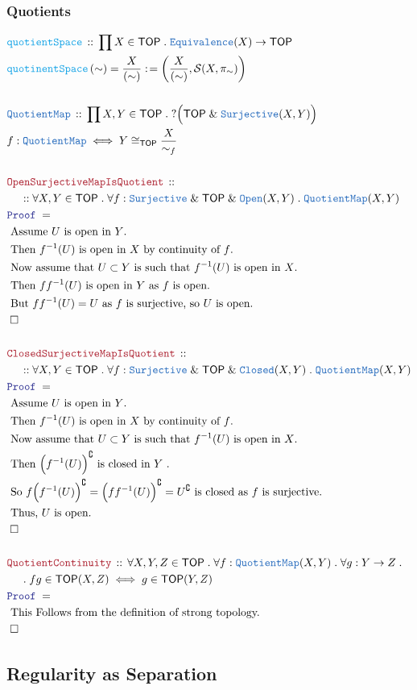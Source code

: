 \documentclass[12pt]{scrartcl}
\newcommand{\TYPE}[1]{\textcolor{NavyBlue}{\mathtt{#1}}}
\newcommand{\FUNC}[1]{\textcolor{Cerulean}{\mathtt{#1}}}
\newcommand{\LOGIC}[1]{\textcolor{Blue}{\mathtt{#1}}}
\newcommand{\THM}[1]{\textcolor{Maroon}{\mathtt{#1}}}
\renewcommand{\.}{\; . \;}
\newcommand{\de}{: \kern 0.1pc =}
\newcommand{\Act}[1]{\left( #1 \right)}
\newcommand{\Theorem}[2]{& \THM{#1} \, :: \, #2 \\ & \Proof = \\ }
\newcommand{\DeclareType}[2]{& \TYPE{#1} \, :: \, #2 \\}
\newcommand{\DefineType}[3]{& #1 : \TYPE{#2} \iff #3 \\}
\newcommand{\DeclareFunc}[2]{& \FUNC{#1} \, :: \, #2 \\}
\newcommand{\DefineNamedFunc}[4]{&  \FUNC{#1}\Act{#2} = #3 \de #4 \\}
\newcommand{\NewLine}{\\ & \kern 1pc}
\newcommand{\Page}[1]{ \begin{align*} #1 \end{align*}   }
\newcommand{\Explain}[1]{& \text{#1.} \\}
\renewcommand{\And}{\; \& \;}
\newcommand{\Surj}{\TYPE{Surjective}}
\renewcommand{\c}{\complement}
\newcommand{\QED}{\; \square}
\newcommand{\EndProof}{& \QED \\}
\newcommand{\Proof}{\LOGIC{Proof} \; }
\newcommand{\Closed}{\TYPE{Closed}}
\newcommand{\Open}{\TYPE{Open}}
\newcommand{\QM}{\TYPE{QuotientMap}}
\newcommand{\TOP}{\mathsf{TOP}}
\renewcommand{\S}{\mathcal{S}}
\begin{document}
\subsubsection{Quotients}
\Page{
	\DeclareFunc{quotientSpace}{\prod X \in \TOP \. \TYPE{Equivalence}(X) \to \TOP}
	\DefineNamedFunc{quotinentSpace}{\sim}{\frac{X}{(\sim)}}{
		\Act{\frac{X}{(\sim)}, \S(X,\pi_\sim)}
	}
	\\
	\DeclareType{QuotientMap}{ 
		\prod X,Y \in \TOP \.    ?\Big(\TOP \And \Surj(X,Y)\Big)
	}
	\DefineType{f}{QuotientMap}{Y \cong_\TOP \frac{X}{\sim_f}}
	\\
	\Theorem{OpenSurjectiveMapIsQuotient}
	{
		\NewLine :: 
		\forall X,Y \in \TOP \.
		\forall f : \Surj \And \TOP \And \Open(X,Y) \.
		\QM(X,Y)	
	}
	\Explain{
		Assume $U$ is open in $Y$}
	\Explain{
		Then $f^{-1}(U)$ is open in $X$ by continuity of $f$}
	\Explain{
		Now assume that $U \subset Y$ is such that $f^{-1}(U)$ is open in $X$}
	\Explain{
		Then $ff^{-1}(U)$ is open in $Y$ as $f$ is open}
	\Explain{
		But $ff^{-1}(U)  = U$ as $f$ is surjective,
		so $U$ is open}
	\EndProof
	\\
	\Theorem{ClosedSurjectiveMapIsQuotient}
	{
		\NewLine :: 
		\forall X,Y \in \TOP \.
		\forall f : \Surj \And \TOP \And \Closed(X,Y) \.
		\QM(X,Y)	
	}
	\Explain{
		Assume $U$ is open in $Y$}
	\Explain{
		Then $f^{-1}(U)$ is open in $X$ by continuity of $f$}
	\Explain{
		Now assume that $U \subset Y$ is such that $f^{-1}(U)$ is open in $X$}
	\Explain{
		Then $\Big(f^{-1}(U)\Big)^\c$ is closed in $Y$ }
	\Explain{
		So  $f\Big( f^{-1}(U) \Big)^\c = \Big( ff^{-1}(U)\Big)^\c = U^\c$ is closed
		as $f$ is surjective}
	\Explain{
		Thus, $U$ is open}
	\EndProof
	\\
	\Theorem{QuotientContinuity}
	{
		\forall X,Y,Z \in \TOP \.
		\forall f : \QM(X,Y) \.
		\forall g : Y \to Z \. \NewLine \.
		fg \in \TOP(X,Z) \iff g \in \TOP(Y,Z)
	}
	\Explain{ This Follows from the definition of strong topology}
	\EndProof
}
\newpage
\subsection{Regularity as Separation}
\end{document}
